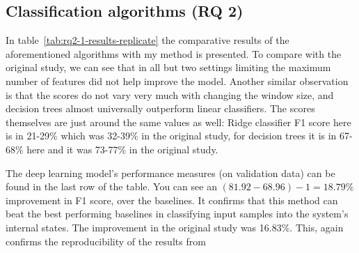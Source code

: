 \subsection{Classification algorithms (RQ 2)}
In table~\ref{tab:rq2-1-results-replicate} the comparative results of the aforementioned algorithms with my method is presented. 
To compare with the original study, we can see that in all but two settings limiting the maximum number of features did not help improve the model. Another similar observation is that the scores do not vary very much with changing the window size, and decision trees almost universally outperform linear classifiers.
The scores themselves are just around the same values as well: Ridge classifier F1 score here is in 21-29\% which was 32-39\% in the original study, for decision trees it is in 67-68\% here and it was 73-77\% in the original study. 

The deep learning model's performance measures (on validation data) can be found in the last row of the table. 
You can see an $(81.92-68.96)-1=18.79\%$ improvement in F1 score, over the baselines. It confirms that this method can beat the best performing baselines in classifying input samples into the system's internal states. The improvement in the original study was 16.83\%. This, again confirms the reproducibility of the results from 

